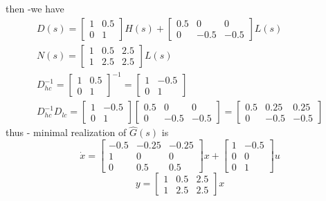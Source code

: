 \documentclass{article}
\begin{document}
    then -we have
    $$
    \begin{array}{l}
    D(s)=\left[\begin{array}{cc}
    1 & 0.5 \\
    0 & 1
    \end{array}\right] H(s)+\left[\begin{array}{ccc}
    0.5 & 0 & 0 \\
    0 & -0.5 & -0.5
    \end{array}\right] L(s) \\
    N(s)=\left[\begin{array}{ccc}
    1 & 0.5 & 2.5 \\
    1 & 2.5 & 2.5
    \end{array}\right] L(s) \\
    D_{h c}^{-1}=\left[\begin{array}{cc}
    1 & 0.5 \\
    0 & 1
    \end{array}\right]^{-1}=\left[\begin{array}{cc}
    1 & -0.5 \\
    0 & 1
    \end{array}\right]\\
    D_{hc}^{-1} D_{lc}=\left[\begin{array}{cc}
    1 & -0.5 \\
    0 & 1
    \end{array}\right]\left[\begin{array}{ccc}
    0.5 & 0 & 0 \\
    0 & -0.5 & -0.5
    \end{array}\right]=\left[\begin{array}{ccc}
    0.5 & 0.25 & 0.25 \\
    0 & -0.5 & -0.5
    \end{array}\right]
    \end{array}
    $$
    thus - minimal realization of $\hat{G}(s)$ is
    $$
    \dot{x}=\left[\begin{array}{ccc}
    -0.5 & -0.25 & -0.25 \\
    1 & 0 & 0 \\
    0 & 0.5 & 0.5
    \end{array}\right] x+\left[\begin{array}{cc}
    1 & -0.5 \\
    0 & 0 \\
    0 & 1
    \end{array}\right] u
    $$
    $$
    y=\left[\begin{array}{lll}
    1 & 0.5 & 2.5 \\
    1 & 2.5 & 2.5
    \end{array}\right]x
    $$
\end{document}
